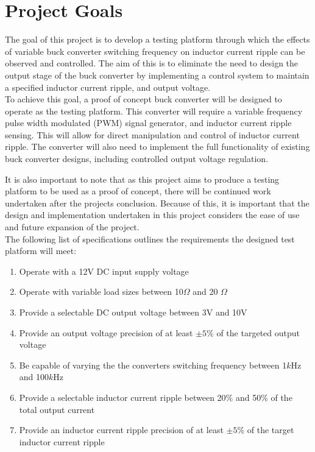 \section{Project Goals}\label{S:goals}

The goal of this project is to develop a testing platform through which the effects of variable buck converter switching frequency on inductor current ripple can be observed and controlled. The aim of this is to eliminate the need to design the output stage of the buck converter by implementing a control system to maintain a specified inductor current ripple, and output voltage.\\

To achieve this goal, a proof of concept buck converter will be designed to operate as the testing platform. This converter will require a variable frequency pulse width modulated (PWM) signal generator, and inductor current ripple sensing. This will allow for direct manipulation and control of inductor current ripple. The converter will also need to implement the full functionality of existing buck converter designs, including controlled output voltage regulation.

It is also important to note that as this project aims to produce a testing platform to be used as a proof of concept, there will be continued work undertaken after the projects conclusion. Because of this, it is important that the design and implementation undertaken in this project considers the ease of use and future expansion of the project.\\

The following list of specifications outlines the requirements the designed test platform will meet:

\begin{enumerate}
    \item Operate with a 12V DC input supply voltage
    \item Operate with variable load sizes between 10$\Omega$ and 20 $\Omega$
    \item Provide a selectable DC output voltage between 3V and 10V
    \item Provide an output voltage precision of at least $\pm5\%$ of the targeted output voltage
    \item Be capable of varying the the converters switching frequency between 1$k$Hz and 100$k$Hz
    \item Provide a selectable inductor current ripple between 20\% and 50\% of the total output current
    \item Provide an inductor current ripple precision of at least $\pm5$\% of the target inductor current ripple 
\end{enumerate}


